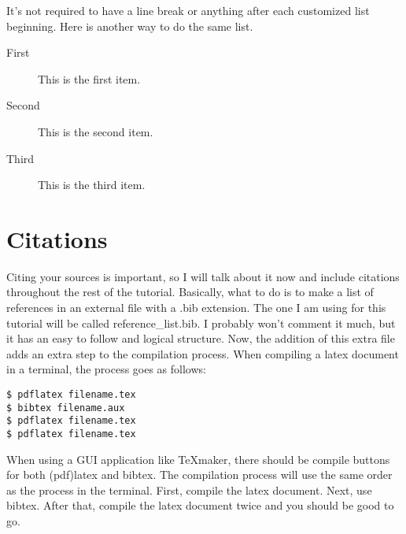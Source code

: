 \documentclass[11pt,letterpaper]{article}
\begin{document}
It's not required to have a line break or anything after each customized list
beginning. Here is another way to do the same list.

\begin{description}
    \item[First] This is the first item.
    \item[Second] This is the second item.
    \item[Third] This is the third item.
\end{description}

\section{Citations}

Citing your sources is important, so I will talk about it now and include
citations throughout the rest of the tutorial. Basically, what to do is to make
a list of references in an external file with a .bib extension. The one I am
using for this tutorial will be called reference\_list.bib. I probably won't
comment it much, but it has an easy to follow and logical structure. Now, the
addition of this extra file adds an extra step to the compilation process. When
compiling a latex document in a terminal, the process goes as follows:

\begin{verbatim}
$ pdflatex filename.tex
$ bibtex filename.aux
$ pdflatex filename.tex
$ pdflatex filename.tex
\end{verbatim}

When using a GUI application like TeXmaker, there should be compile buttons for
both (pdf)latex and bibtex. The compilation process will use the same order as
the process in the terminal. First, compile the latex document. Next, use
bibtex. After that, compile the latex document twice and you should be good to
go.
\end{document}
